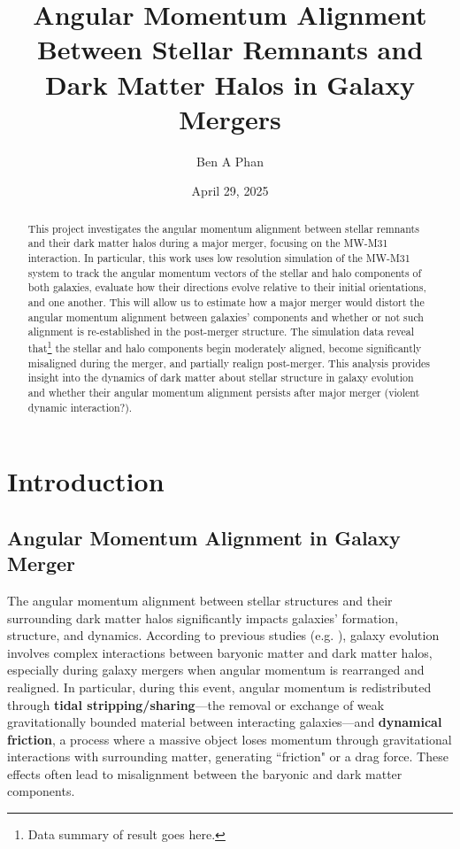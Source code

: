 \documentclass[twocolumn]{aastex631}
\begin{document}
\title{Angular Momentum Alignment Between Stellar Remnants and Dark Matter Halos in Galaxy Mergers}
\author{Ben A Phan}
\date{April 29, 2025}

\begin{abstract}
    This project investigates the angular momentum alignment between stellar remnants and their dark matter halos during a major merger, focusing on the MW-M31 interaction. In particular, this work uses low resolution simulation of the MW-M31 system to track the angular momentum vectors of the stellar and halo components of both galaxies, evaluate how their directions evolve relative to their initial orientations, and one another. This will allow us to estimate how a major merger would distort the angular momentum alignment between galaxies' components and whether or not such alignment is re-established in the post-merger structure. The simulation data reveal that\footnote{Data summary of result goes here.} the stellar and halo components begin moderately aligned, become significantly misaligned during the merger, and partially realign post-merger. This analysis provides insight into the dynamics of dark matter about stellar structure in galaxy evolution and whether their angular momentum alignment persists after major merger (violent dynamic interaction?).
\end{abstract}



\section{Introduction}


\subsection{Angular Momentum Alignment in Galaxy Merger}
The angular momentum alignment between stellar structures and their surrounding dark matter halos significantly impacts galaxies' formation, structure, and dynamics. According to previous studies (e.g. \cite{Somerville2008, Chua2019, Baptista2023}), galaxy evolution involves complex interactions between baryonic matter and dark matter halos, especially during galaxy mergers when angular momentum is rearranged and realigned. In particular, during this event, angular momentum is redistributed through \textbf{tidal stripping/sharing}—the removal or exchange of weak gravitationally bounded material between interacting galaxies—and \textbf{dynamical friction}, a process where a massive object loses momentum through gravitational interactions with surrounding matter, generating ``friction" or a drag force. These effects often lead to misalignment between the baryonic and dark matter components. 
\end{document}
